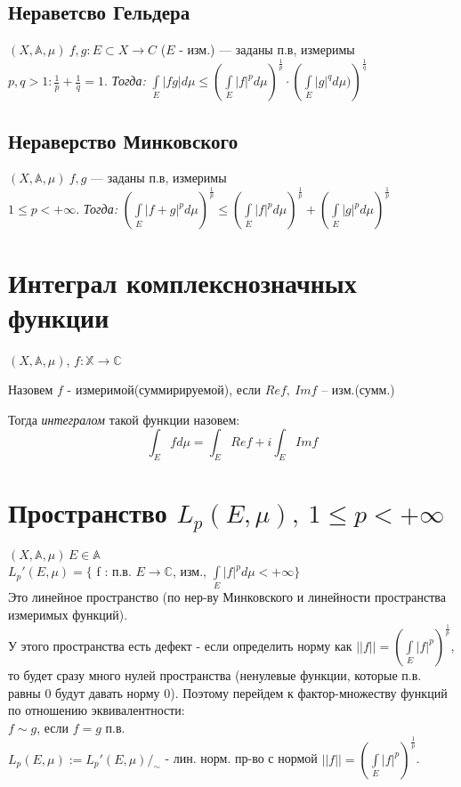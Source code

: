 \documentclass[paper=a4, fontsize=17pt]{article}
\begin{document}
	\subsection{Нераветсво Гельдера}
	$(X, \mathds{A}, \mu)\ f, g : E \subset X \rightarrow C$ ($E$ - изм.) --- заданы п.в, измеримы\\
	$p, q > 1 : \frac{1}{p} + \frac{1}{q} = 1$. 
	\emph{Тогда:}
	${\displaystyle \int\limits_E |fg|d\mu \leq \left(\int\limits_E |f|^p d\mu\right)^\frac{1}{p} \cdot \left(\int\limits_E |g|^q d\mu)\right)^\frac{1}{q}}$
	\subsection{Нераверство Минковского}
	$(X, \mathds{A}, \mu)\ f, g $ --- заданы п.в, измеримы\\
	$1 \leq p < +\infty$. 
	\emph{Тогда:}
	${\displaystyle \left(\int\limits_E |f + g|^p d\mu \right)^\frac{1}{p} 
		\leq \left(\int\limits_E |f|^p d\mu\right)^\frac{1}{p} 
		+ \left(\int\limits_E |g|^p d\mu\right)^\frac{1}{p}}$
	
	\section{Интеграл комплекснозначных функции}
	$ (X, \mathbb{A}, \mu) $, $ f : \mathbb{X} \rightarrow \mathbb{C} $
	
	Назовем $ f $ - измеримой(суммирируемой), если $ Re f, ~ Im f $ -- изм.(сумм.)
	
	Тогда \emph{интегралом} такой функции назовем:
	$$ \int_E f d\mu = \int_E Re f + i\int_E Im f $$
	
	\section{Пространство $L_p(E,\mu),\ 1 \leq p < +\infty$}
	$(X, \mathds{A}, \mu)\, E \in \mathds{A}$\\
	$L_p'(E, \mu) = \{$ f : п.в. $E \rightarrow \mathbb{C}$, изм., $ \int\limits_E |f|^p d\mu < +\infty \}$\\
	Это линейное пространство (по нер-ву Минковского и линейности пространства измеримых функций).\\
	У этого пространства есть дефект - если определить норму как $||f|| = \left(\int\limits_E |f|^p\right)^\frac{1}{p}$, то будет сразу много нулей пространства (ненулевые функции, которые п.в. равны 0 будут давать норму 0).
	Поэтому перейдем к фактор-множеству функций по отношению эквивалентности:\\
	$f \sim g$, если $f = g$ п.в.\\
	$ L_p(E, \mu) := L_p'(E, \mu) /_{\sim}$ - лин. норм. пр-во с нормой $||f|| = \left(\int\limits_E |f|^p\right)^\frac{1}{p}$.\\
	
\end{document}
